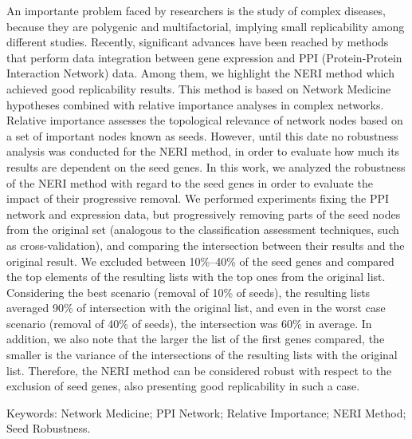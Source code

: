 

\begin{resumo}
    
An importante problem faced by researchers is the study of complex diseases, because they are polygenic and multifactorial, implying small replicability among different studies.
Recently, significant advances have been reached by methods that perform data integration between gene expression and PPI (Protein-Protein Interaction Network) data.
Among them, we highlight the NERI method which achieved good replicability results.
This method is based on Network Medicine hypotheses combined with relative importance analyses in complex networks.
Relative importance assesses the topological relevance of network nodes based on a set of important nodes known as seeds.
However, until this date no robustness analysis was conducted for the NERI method, in order to evaluate how much its results are dependent on the seed genes.
In this work, we analyzed the robustness of the NERI method with regard to the seed genes in order to evaluate the impact of their progressive removal.
We performed experiments fixing the PPI network and expression data, but progressively removing parts of the seed nodes from the original set (analogous to the classification assessment techniques, such as cross-validation), and comparing the intersection between their results and the original result.
We excluded between 10\%--40\% of the seed genes and compared the top elements of the resulting lists with the top ones from the original list.
Considering the best scenario (removal of 10\% of seeds), the resulting lists averaged 90\% of intersection with the original list, and even in the worst case scenario (removal of 40\% of seeds), the intersection was 60\% in average.
In addition, we also note that the larger the list of the first genes compared, the smaller is the variance of the intersections of the resulting lists with the original list.
Therefore, the NERI method can be considered robust with respect to the exclusion of seed genes, also presenting good replicability in such a case.

Keywords: Network Medicine; PPI Network; Relative Importance; NERI Method; Seed Robustness.
\end{resumo}


    